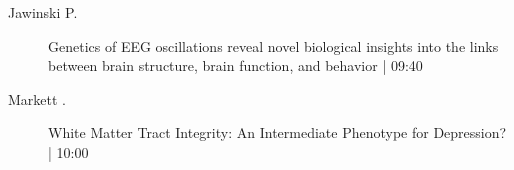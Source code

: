 \begin{symposium}
\begin{description}
                \item [ Jawinski P.] Genetics of EEG oscillations reveal novel biological insights into the links between brain structure, brain function, and behavior \textcolor{mygray}{ | 09:40}    
                
                \item [ Markett  .] White Matter Tract Integrity: An Intermediate Phenotype for Depression? \textcolor{mygray}{ | 10:00}    
                
            \end{description} 
            \end{symposium}
            